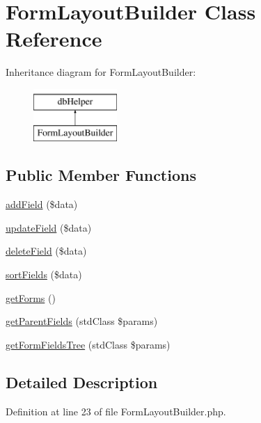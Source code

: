 \hypertarget{class_form_layout_builder}{\section{\-Form\-Layout\-Builder \-Class \-Reference}
\label{class_form_layout_builder}
}
\-Inheritance diagram for \-Form\-Layout\-Builder\-:\begin{figure}[H]
\begin{center}
\leavevmode
\includegraphics[height=2.000000cm]{class_form_layout_builder}
\end{center}
\end{figure}
\subsection*{\-Public \-Member \-Functions}
\begin{DoxyCompactItemize}
\item 
\hyperlink{class_form_layout_builder_a09d2fcc356ffec482c2288ed3128f55d}{add\-Field} (\$data)
\item 
\hyperlink{class_form_layout_builder_af1ac76169bfb7bbb995f000d5bb9ac2e}{update\-Field} (\$data)
\item 
\hyperlink{class_form_layout_builder_a383f52a44383e21583989705ef0d630d}{delete\-Field} (\$data)
\item 
\hyperlink{class_form_layout_builder_afcb5238ce6ce86f873765792f9f18ad8}{sort\-Fields} (\$data)
\item 
\hyperlink{class_form_layout_builder_a9ff1809bc98bb7a1526eb4e035c1ffa8}{get\-Forms} ()
\item 
\hyperlink{class_form_layout_builder_ad7d4c76349c0ed04f32ca58530ffd16b}{get\-Parent\-Fields} (std\-Class \$params)
\item 
\hyperlink{class_form_layout_builder_ac89522e4c6cb3d293adce3bd72e91827}{get\-Form\-Fields\-Tree} (std\-Class \$params)
\end{DoxyCompactItemize}


\subsection{\-Detailed \-Description}


\-Definition at line 23 of file \-Form\-Layout\-Builder.\-php.



